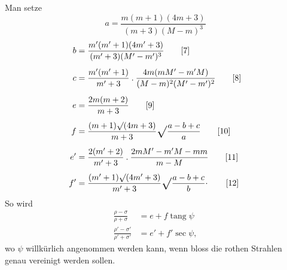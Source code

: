 Man setze
\begin{equation}
a=\frac{m(m+1)(4m+3)}{(m+3)(M-m)^3}\tag*{[6]}
\end{equation}
\clearpage{}
\begin{align}
b&=\frac{m'(m'+1)(4m'+3)}{(m'+3)(M'-m')^3}\tag*{[7]}\\[5pt]
c&=\frac{m'(m'+1)}{m'+3}\mathbin{.}\frac{4m(mM'-m'M)}{(M-m)^2(M'-m')^2}\tag*{[8]}\\[5pt]
e&=\frac{2m(m+2)}{m+3}\tag*{[9]}\\[5pt]
f&=\frac{(m+1)\surd(4m+3)}{m+3}\Vroot\frac{a-b+c}{a}\tag*{[10]}\\[5pt]
e'&=\frac{2(m'+2)}{m'+3}\mathbin{.}\frac{2mM'-m'M-mm}{m-M}\tag*{[11]}\\[5pt]
f'&=\frac{(m'+1)\surd(4m'+3)}{m'+3}\Vroot\frac{a-b+c}{b}\Vpoint\tag*{[12]}
\end{align}
\noindent So wird
\begin{align}
\frac{\rho-\sigma}{\rho+\sigma}&=e+f\operatorname{tang}\psi\tag*{[Ia]}\\[5pt]
\frac{\rho'-\sigma'}{\rho'+\sigma'}&=e'+f'\sec\psi,\tag*{[Ib]}
\end{align}
\noindent wo $\psi$ willkürlich angenommen werden kann, wenn bloss die rothen Strahlen genau vereinigt werden sollen.

